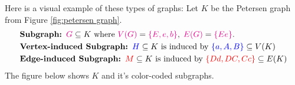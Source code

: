 Here is a visual example of these types of graphs: Let $K$ be the Petersen graph from Figure \ref{fig:petersen graph}.
\begin{align*}
    &\textbf{Subgraph: } \textcolor{magenta}{G} \subseteq K \text{ where }\textcolor{magenta}{V(G)} = \textcolor{magenta}{\{E, e, b\}},\; \textcolor{magenta}{E(G)} = \textcolor{magenta}{\{Ee\}}.\\
    &\textbf{Vertex-induced Subgraph: } \textcolor{blue}{H} \subseteq K \text{ is induced by } \textcolor{blue}{\{a, A, B\}}\subseteq V(K)\\
    &\textbf{Edge-induced Subgraph: } \textcolor{red}{M} \subseteq K 
    \text{ is induced by }\textcolor{red}{\{Dd, DC, Cc\}}\subseteq E(K)
\end{align*}
The figure below shows $K$ and it's color-coded subgraphs.

